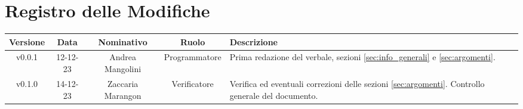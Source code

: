 \section*{\Large Registro delle Modifiche}
    \begin{table}[h]
        \centering
        \renewcommand\tabularxcolumn[1]{m{#1}} %
        \renewcommand{\arraystretch}{1.5}
        \begin{tabularx}{0.98\textwidth}
            {c|c|c|c|>{\centering\arraybackslash}X}
            \rowcolor{black}
            \textbf{\color{white} Versione} & \textbf{\color{white} Data} & \textbf{\color{white} Nominativo} & \textbf{\color{white} Ruolo} & \textbf{\color{white} Descrizione} \\ 
            \hline

            v0.0.1 & 12-12-23 & Andrea Mangolini & Programmatore & Prima redazione del verbale, sezioni \ref{sec:info_generali} e \ref{sec:argomenti}. \\
            v0.1.0 & 14-12-23 & Zaccaria Marangon & Verificatore & Verifica ed eventuali correzioni delle sezioni \ref{sec:argomenti}. Controllo generale del documento.  \\
            \hline
        \end{tabularx}
    \end{table}